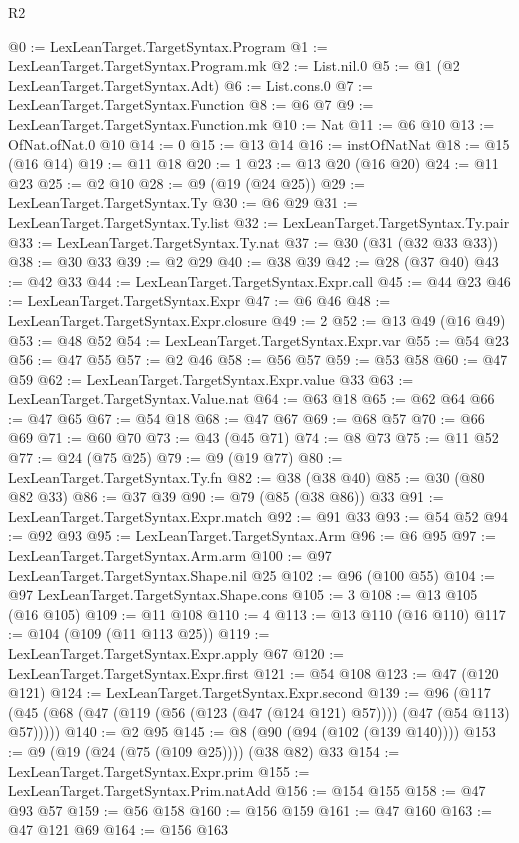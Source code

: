 \begin{lexlean}{R2}
\begin{coremodule}
@0 := LexLeanTarget.TargetSyntax.Program
@1 := LexLeanTarget.TargetSyntax.Program.mk
@2 := List.nil.{0}
@5 := @1 (@2 LexLeanTarget.TargetSyntax.Adt)
@6 := List.cons.{0}
@7 := LexLeanTarget.TargetSyntax.Function
@8 := @6 @7
@9 := LexLeanTarget.TargetSyntax.Function.mk
@10 := Nat
@11 := @6 @10
@13 := OfNat.ofNat.{0} @10
@14 := 0
@15 := @13 @14
@16 := instOfNatNat
@18 := @15 (@16 @14)
@19 := @11 @18
@20 := 1
@23 := @13 @20 (@16 @20)
@24 := @11 @23
@25 := @2 @10
@28 := @9 (@19 (@24 @25))
@29 := LexLeanTarget.TargetSyntax.Ty
@30 := @6 @29
@31 := LexLeanTarget.TargetSyntax.Ty.list
@32 := LexLeanTarget.TargetSyntax.Ty.pair
@33 := LexLeanTarget.TargetSyntax.Ty.nat
@37 := @30 (@31 (@32 @33 @33))
@38 := @30 @33
@39 := @2 @29
@40 := @38 @39
@42 := @28 (@37 @40)
@43 := @42 @33
@44 := LexLeanTarget.TargetSyntax.Expr.call
@45 := @44 @23
@46 := LexLeanTarget.TargetSyntax.Expr
@47 := @6 @46
@48 := LexLeanTarget.TargetSyntax.Expr.closure
@49 := 2
@52 := @13 @49 (@16 @49)
@53 := @48 @52
@54 := LexLeanTarget.TargetSyntax.Expr.var
@55 := @54 @23
@56 := @47 @55
@57 := @2 @46
@58 := @56 @57
@59 := @53 @58
@60 := @47 @59
@62 := LexLeanTarget.TargetSyntax.Expr.value @33
@63 := LexLeanTarget.TargetSyntax.Value.nat
@64 := @63 @18
@65 := @62 @64
@66 := @47 @65
@67 := @54 @18
@68 := @47 @67
@69 := @68 @57
@70 := @66 @69
@71 := @60 @70
@73 := @43 (@45 @71)
@74 := @8 @73
@75 := @11 @52
@77 := @24 (@75 @25)
@79 := @9 (@19 @77)
@80 := LexLeanTarget.TargetSyntax.Ty.fn
@82 := @38 (@38 @40)
@85 := @30 (@80 @82 @33)
@86 := @37 @39
@90 := @79 (@85 (@38 @86)) @33
@91 := LexLeanTarget.TargetSyntax.Expr.match
@92 := @91 @33
@93 := @54 @52
@94 := @92 @93
@95 := LexLeanTarget.TargetSyntax.Arm
@96 := @6 @95
@97 := LexLeanTarget.TargetSyntax.Arm.arm
@100 := @97 LexLeanTarget.TargetSyntax.Shape.nil @25
@102 := @96 (@100 @55)
@104 := @97 LexLeanTarget.TargetSyntax.Shape.cons
@105 := 3
@108 := @13 @105 (@16 @105)
@109 := @11 @108
@110 := 4
@113 := @13 @110 (@16 @110)
@117 := @104 (@109 (@11 @113 @25))
@119 := LexLeanTarget.TargetSyntax.Expr.apply @67
@120 := LexLeanTarget.TargetSyntax.Expr.first
@121 := @54 @108
@123 := @47 (@120 @121)
@124 := LexLeanTarget.TargetSyntax.Expr.second
@139 := @96 (@117 (@45 (@68 (@47 (@119 (@56 (@123 (@47 (@124 @121) @57)))) (@47 (@54 @113) @57)))))
@140 := @2 @95
@145 := @8 (@90 (@94 (@102 (@139 @140))))
@153 := @9 (@19 (@24 (@75 (@109 @25)))) (@38 @82) @33
@154 := LexLeanTarget.TargetSyntax.Expr.prim
@155 := LexLeanTarget.TargetSyntax.Prim.natAdd
@156 := @154 @155
@158 := @47 @93 @57
@159 := @56 @158
@160 := @156 @159
@161 := @47 @160
@163 := @47 @121 @69
@164 := @156 @163

\end{coremodule}
\end{lexlean}
